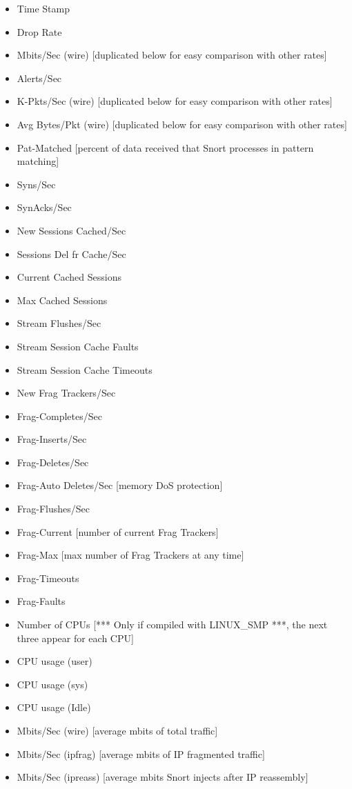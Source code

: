 \documentclass[english]{report}
\begin{document}
\begin{itemize}
\item Time Stamp
\item Drop Rate
\item Mbits/Sec (wire) [duplicated below for easy comparison with other rates]
\item Alerts/Sec 
\item K-Pkts/Sec (wire) [duplicated below for easy comparison with other rates]
\item Avg Bytes/Pkt (wire) [duplicated below for easy comparison with other rates]
\item Pat-Matched [percent of data received that Snort processes in pattern matching]
\item Syns/Sec
\item SynAcks/Sec
\item New Sessions Cached/Sec
\item Sessions Del fr Cache/Sec
\item Current Cached Sessions
\item Max Cached Sessions
\item Stream Flushes/Sec
\item Stream Session Cache Faults
\item Stream Session Cache Timeouts
\item New Frag Trackers/Sec
\item Frag-Completes/Sec
\item Frag-Inserts/Sec
\item Frag-Deletes/Sec
\item Frag-Auto Deletes/Sec [memory DoS protection]
\item Frag-Flushes/Sec
\item Frag-Current [number of current Frag Trackers]
\item Frag-Max [max number of Frag Trackers at any time]
\item Frag-Timeouts
\item Frag-Faults
\item Number of CPUs [*** Only if compiled with LINUX\_SMP ***, the next three appear for each CPU]
\item CPU usage (user)
\item CPU usage (sys)
\item CPU usage (Idle)
\item Mbits/Sec (wire) [average mbits of total traffic]
\item Mbits/Sec (ipfrag) [average mbits of IP fragmented traffic]
\item Mbits/Sec (ipreass) [average mbits Snort injects after IP reassembly]

\end{itemize}
\end{document}
